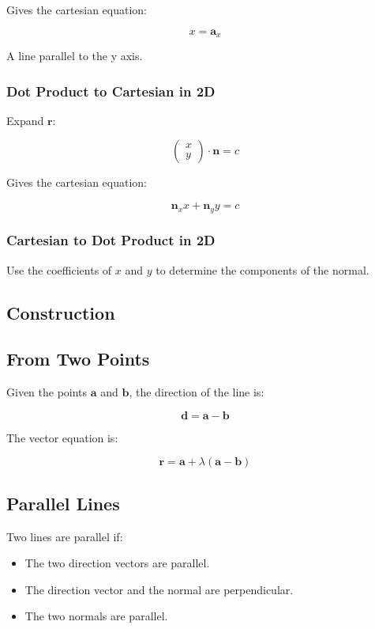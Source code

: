 \documentclass[a4paper,11pt]{article}
\newcommand{\bb}{\boldsymbol}
\begin{document}
Gives the cartesian equation:

$$
x = \bb{a}_x
$$

A line parallel to the y axis.


\subsubsection{Dot Product to Cartesian in 2D}

Expand $\bb{r}$:

$$
\begin{pmatrix} x \\ y \end{pmatrix} \cdot \bb{n} = c
$$

Gives the cartesian equation:

$$
\bb{n}_x x + \bb{n}_y y = c
$$


\subsubsection{Cartesian to Dot Product in 2D}

Use the coefficients of $x$ and $y$ to determine the components of the normal.


\subsection{Construction}

\subsection{From Two Points}

Given the points $\bb{a}$ and $\bb{b}$, the direction of the line is:

$$
\bb{d} = \bb{a} - \bb{b}
$$

The vector equation is:

$$
\bb{r} = \bb{a} + \lambda (\bb{a} - \bb{b})
$$


\subsection{Parallel Lines}

Two lines are parallel if:

\begin{itemize}
\item The two direction vectors are parallel.
\item The direction vector and the normal are perpendicular.
\item The two normals are parallel.
\end{itemize}
\end{document}
